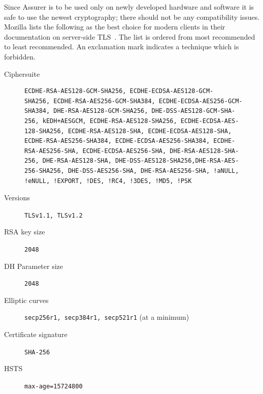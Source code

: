 Since Assurer is to be used only on newly developed hardware and software it is safe to use the newest cryptography; there should not be any compatibility issues. Mozilla lists the following as the best choice for modern clients in their documentation on server-side TLS~\cite{mozilla}. The list is ordered from most recommended to least recommended. An exclamation mark indicates a technique which is forbidden.
\begin{description}
	\item [Ciphersuite]
  \begin{verbatim}
ECDHE-RSA-AES128-GCM-SHA256, ECDHE-ECDSA-AES128-GCM-
SHA256, ECDHE-RSA-AES256-GCM-SHA384, ECDHE-ECDSA-AES256-GCM-
SHA384, DHE-RSA-AES128-GCM-SHA256, DHE-DSS-AES128-GCM-SHA-
256, kEDH+AESGCM, ECDHE-RSA-AES128-SHA256, ECDHE-ECDSA-AES-
128-SHA256, ECDHE-RSA-AES128-SHA, ECDHE-ECDSA-AES128-SHA,
ECDHE-RSA-AES256-SHA384, ECDHE-ECDSA-AES256-SHA384, ECDHE-
RSA-AES256-SHA, ECDHE-ECDSA-AES256-SHA, DHE-RSA-AES128-SHA-
256, DHE-RSA-AES128-SHA, DHE-DSS-AES128-SHA256,DHE-RSA-AES-
256-SHA256, DHE-DSS-AES256-SHA, DHE-RSA-AES256-SHA, !aNULL,
!eNULL, !EXPORT, !DES, !RC4, !3DES, !MD5, !PSK\end{verbatim}
  \item [Versions] \texttt{TLSv1.1, TLSv1.2}
  \item [RSA key size] \texttt{2048}
  \item [DH Parameter size] \texttt{2048}
  \item [Elliptic curves] \texttt{secp256r1, secp384r1, secp521r1} (at a minimum)
  \item [Certificate signature] \texttt{SHA-256}
  \item [HSTS] \texttt{max-age=15724800}
\end{description}

